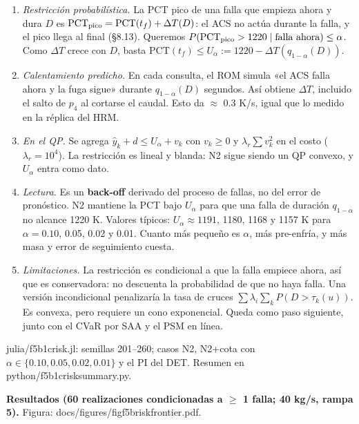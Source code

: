 \documentclass[11pt,a4paper]{article}
\newcommand{\codeus}{\textunderscore\allowbreak}
\newcommand{\code}[1]{{\small\ttfamily\let\_\codeus #1}}
\begin{document}
\begin{enumerate}
\item \emph{Restricción probabilística.} La PCT pico de una falla que empieza ahora y dura $D$ es $\mathrm{PCT}_{\rm pico}=\mathrm{PCT}(t_f)+\Delta T(D)$: el ACS no actúa durante la falla, y el pico llega al final (\S{}8.13). Queremos $P(\mathrm{PCT}_{\rm pico}>1220\mid\text{falla ahora})\le\alpha$. Como $\Delta T$ crece con $D$, basta $\mathrm{PCT}(t_f)\le U_\alpha:=1220-\Delta T(q_{1-\alpha}(D))$.
\item \emph{Calentamiento predicho.} En cada consulta, el ROM simula «el ACS falla ahora y la fuga sigue» durante $q_{1-\alpha}(D)$ segundos. Así obtiene $\Delta T$, incluido el salto de $p_4$ al cortarse el caudal. Esto da $\approx$ 0.3 K/s, igual que lo medido en la réplica del HRM.
\item \emph{En el QP.} Se agrega $\hat y_k+d\le U_\alpha+v_k$ con $v_k\ge0$ y $\lambda_r\sum v_k^2$ en el costo ($\lambda_r=10^4$). La restricción es lineal y blanda: N2 sigue siendo un QP convexo, y $U_\alpha$ entra como dato.
\item \emph{Lectura.} Es un \textbf{back-off} derivado del proceso de fallas, no del error de pronóstico. N2 mantiene la PCT bajo $U_\alpha$ para que una falla de duración $q_{1-\alpha}$ no alcance 1220 K. Valores típicos: $U_\alpha\approx1191$, 1180, 1168 y 1157 K para $\alpha=0.10$, 0.05, 0.02 y 0.01. Cuanto más pequeño es $\alpha$, más pre-enfría, y más masa y error de seguimiento cuesta.
\item \emph{Limitaciones.} La restricción es condicional a que la falla empiece ahora, así que es conservadora: no descuenta la probabilidad de que no haya falla. Una versión incondicional penalizaría la tasa de cruces $\sum\lambda_i\sum_k P(D>\tau_k(u))$. Es convexa, pero requiere un cono exponencial. Queda como paso siguiente, junto con el CVaR por SAA y el PSM en línea.
\end{enumerate}

\code{julia/f5b1c\_risk.jl}: semillas 201–260; casos N2, N2+cota con $\alpha\in\{0.10,0.05,0.02,0.01\}$ y el PI del DET. Resumen en \code{python/f5b1c\_risk\_summary.py}.

\textbf{Resultados (60 realizaciones condicionadas a $\ge$ 1 falla; 40 kg/s, rampa 5).} Figura: \code{docs/figures/fig\_f5b\_risk\_frontier.pdf}.
\end{document}

